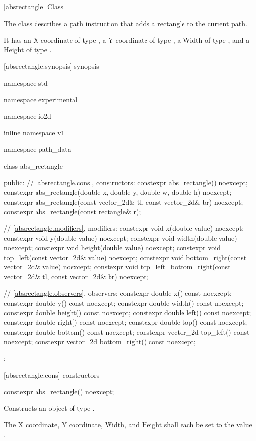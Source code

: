  [absrectangle] {Class }

\pnum
{}
The class  describes a path instruction that adds a rectangle to the current path.

\pnum
It has an X coordinate of type , a Y coordinate of type , a Width of type , and a Height of type .

 [absrectangle.synopsis] { synopsis}

\begin{codeblock}
namespace std { namespace experimental { namespace io2d { inline namespace v1 {
  namespace path_data {
    class abs_rectangle {
    public:
      // \ref{absrectangle.cons}, constructors:
      constexpr abs_rectangle() noexcept;
      constexpr abs_rectangle(double x, double y, double w, double h) noexcept;
      constexpr abs_rectangle(const vector_2d& tl, const vector_2d& br) 
        noexcept;
      constexpr abs_rectangle(const rectangle& r);

      // \ref{absrectangle.modifiers}, modifiers:
      constexpr void x(double value) noexcept;
      constexpr void y(double value) noexcept;
      constexpr void width(double value) noexcept;
      constexpr void height(double value) noexcept;
      constexpr void top_left(const vector_2d& value) noexcept;
      constexpr void bottom_right(const vector_2d& value) noexcept;
      constexpr void top_left_bottom_right(const vector_2d& tl,
        const vector_2d& br) noexcept;

      // \ref{absrectangle.observers}, observers:
      constexpr double x() const noexcept;
      constexpr double y() const noexcept;
      constexpr double width() const noexcept;
      constexpr double height() const noexcept;
      constexpr double left() const noexcept;
      constexpr double right() const noexcept;
      constexpr double top() const noexcept;
      constexpr double bottom() const noexcept;
      constexpr vector_2d top_left() const noexcept;
      constexpr vector_2d bottom_right() const noexcept;
    };
  }
} } } }
\end{codeblock}

 [absrectangle.cons] { constructors}

\begin{itemdecl}
constexpr abs_rectangle() noexcept;
\end{itemdecl}
\begin{itemdescr}
\pnum
\effects
Constructs an object of type .

\pnum
The X coordinate, Y coordinate, Width, and Height shall each be set to the value .
\end{itemdescr}

